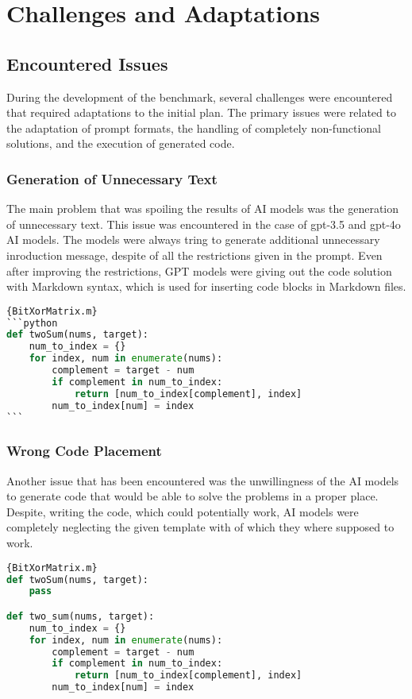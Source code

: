 
\section{Challenges and Adaptations}



\subsection{Encountered Issues}

During the development of the benchmark, several challenges were encountered that required adaptations to the initial plan. The primary issues were related to the adaptation of prompt formats, the handling of completely non-functional solutions, and the execution of generated code.

\subsubsection{Generation of Unnecessary Text}
The main problem that was spoiling the results of AI models was the generation of unnecessary text. This issue was encountered in the case of gpt-3.5 and gpt-4o AI models. The models were always tring to generate additional unnecessary inroduction message, despite of all the restrictions given in the prompt. Even after improving the restrictions, GPT models were giving out the code solution with Markdown syntax, which is used for inserting code blocks in Markdown files.

\begin{lstlisting}[language=Python]{BitXorMatrix.m}
```python
def twoSum(nums, target):
    num_to_index = {}
    for index, num in enumerate(nums):
        complement = target - num
        if complement in num_to_index:
            return [num_to_index[complement], index]
        num_to_index[num] = index
```
\end{lstlisting}

\subsubsection{Wrong Code Placement}
Another issue that has been encountered was the unwillingness of the AI models to generate code that would be able to solve the problems in a proper place. Despite, writing the code, which could potentially work, AI models were completely neglecting the given template with of which they where supposed to work.

\begin{lstlisting}[language=Python]{BitXorMatrix.m}
def twoSum(nums, target):
    pass

def two_sum(nums, target):
    num_to_index = {}
    for index, num in enumerate(nums):
        complement = target - num
        if complement in num_to_index:
            return [num_to_index[complement], index]
        num_to_index[num] = index
    \end{lstlisting}

